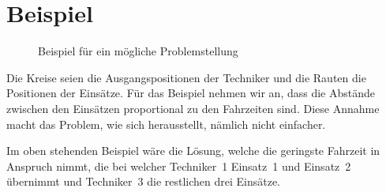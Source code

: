 \documentclass[a4paper,notitlepage,12pt]{report}
\begin{document}
\section{Beispiel}

\begin{figure}[H]
    \begin{center}
        \caption{Beispiel für ein mögliche Problemstellung}
    \end{center}
\end{figure}

Die Kreise seien die Ausgangspositionen der Techniker und die Rauten die Positionen
der Einsätze. Für das Beispiel nehmen wir an, dass die Abstände zwischen den Einsätzen
proportional zu den Fahrzeiten sind. Diese Annahme macht das Problem, wie sich
herausstellt, nämlich nicht einfacher.

Im oben stehenden Beispiel wäre die Lösung, welche die geringste Fahrzeit in Anspruch
nimmt, die bei welcher Techniker 1 Einsatz 1 und Einsatz 2 übernimmt und Techniker 3
die restlichen drei Einsätze.
\end{document}
